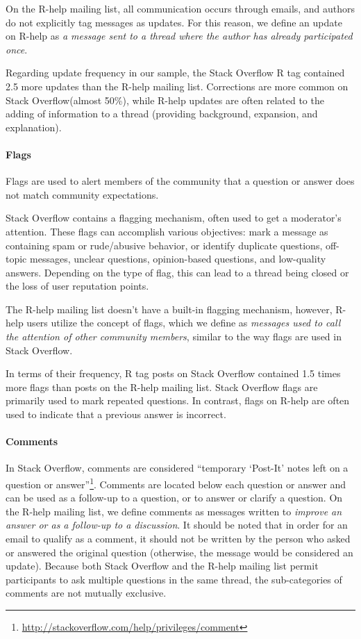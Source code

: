 \documentclass[smallextended]{svjour3}       %
\newcommand{\SO}{Stack Overflow\xspace}
\newcommand{\RH}{R-help\xspace}
\begin{document}
On the \RH mailing list, all communication occurs through emails, and authors do not explicitly tag messages as updates. For this reason, we define an update on \RH as \emph{a message sent to a thread where the author has already participated once}.

Regarding update frequency in our sample, the \SO R tag contained 2.5 more updates than the \RH mailing list. Corrections are more common on \SO (almost 50\%), while \RH updates are often related to the adding of information to a thread (providing background, expansion, and explanation).

\paragraph{Flags}
Flags are used to alert members of the community that a question or answer does not match community expectations.

\SO contains a flagging mechanism, often used to get a moderator's attention. These flags can accomplish various objectives: mark a message as containing spam or rude/abusive behavior, or identify
duplicate questions, off-topic messages, unclear questions, opinion-based questions, and low-quality
answers. Depending on the type of flag, this can lead to a thread being closed or the loss of user reputation points.  

The \RH mailing list doesn't have a built-in flagging mechanism, however, \RH users utilize the concept of flags, which we define as \emph{messages used to call the attention of other community members}, similar to the way flags are used in \SO.



In terms of their frequency, R tag posts on \SO contained 1.5 times more flags than posts on the \RH mailing list. \SO flags are primarily used to mark repeated questions. In contrast, flags on \RH are often used to indicate that a previous answer is incorrect.

\paragraph{Comments}

In \SO, comments are considered ``temporary `Post-It' notes left on a question or answer''\footnote{\url{http://stackoverflow.com/help/privileges/comment}}. Comments are located below each question or answer and can be used as a follow-up to a question, or to answer or clarify a question. On the \RH mailing list, we define comments as messages written to \emph{improve an answer or as a follow-up to a discussion}. It should be noted that in order for an email to qualify as a comment, it should not be written by the person who asked or answered the original question (otherwise, the message would be considered an update).
Because both \SO and the \RH mailing list permit participants to ask multiple questions in the same thread, the sub-categories of comments are not mutually exclusive.  
\end{document}
